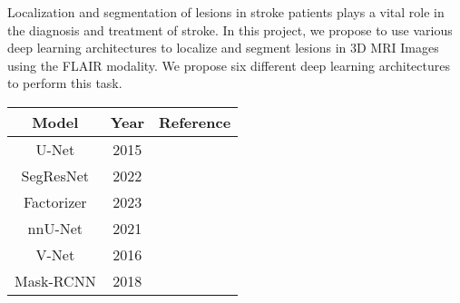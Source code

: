 
Localization and segmentation of lesions in stroke patients plays a vital role
in the diagnosis and treatment of stroke. In this project, we
propose to use various deep learning architectures to localize and 
segment lesions in 3D MRI Images using the FLAIR modality. We propose 
six different deep learning architectures to perform this task. \par
\medskip
\begin{center}
\begin{tabular}{||c c c||} 
    \hline
    Model & Year & Reference\\ [0.5ex] 
    \hline\hline
    U-Net & 2015 & \cite{ronneberger_u-net_2015}\\
    \hline
    SegResNet & 2022 & \cite{siddique_automated_2022} \\
    \hline
    Factorizer & 2023 & \cite{ashtari_factorizer_2023} \\
    \hline
    nnU-Net & 2021 & \cite{isensee_nnu-net_2021} \\
    \hline
    V-Net & 2016 & \cite{milletari_v-net_2016} \\  
    \hline
    Mask-RCNN & 2018 & \cite{he_mask_2018} \\  
    \hline
\end{tabular}
\end{center}